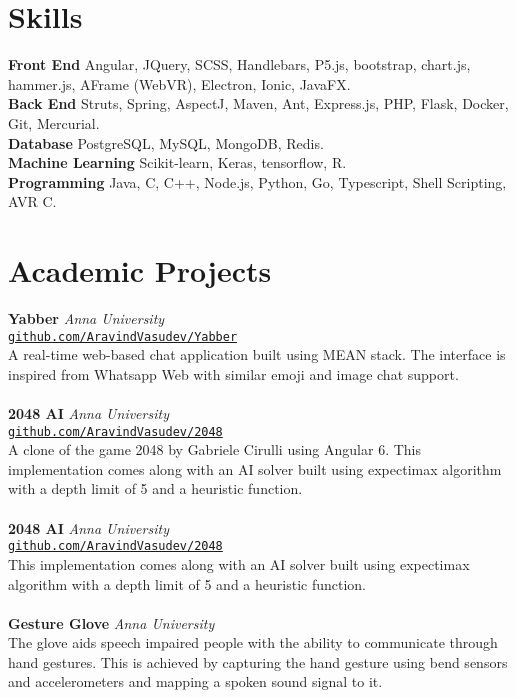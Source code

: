 \documentclass{resume}
\begin{document}
\begin{multicols*}{2}
\section*{Skills}
\noindent
\textbf{Front End} Angular, JQuery, SCSS, Handlebars, P5.js, bootstrap, chart.js, hammer.js, AFrame (WebVR), Electron, Ionic, JavaFX. \\
\textbf{Back End} Struts, Spring, AspectJ, Maven, Ant, Express.js, PHP, Flask, Docker, Git, Mercurial. \\
\textbf{Database} PostgreSQL, MySQL, MongoDB, Redis. \\
\textbf{Machine Learning} Scikit-learn, Keras, tensorflow, R. \\
\textbf{Programming} Java, C, C++, Node.js, Python, Go, Typescript, Shell Scripting, AVR C.

\section*{Academic Projects}
\noindent
\textbf{Yabber} \hfill \textit{Anna University} \\
\texttt{\small \href{https://github.com/AravindVasudev/Yabber}{github.com/AravindVasudev/Yabber}} \\
A real-time web-based chat application built using MEAN stack. The interface is inspired from Whatsapp Web with similar emoji and image chat support. \\
\\
\textbf{2048 AI} \hfill \textit{Anna University} \\
\texttt{\small \href{https://github.com/AravindVasudev/2048}{github.com/AravindVasudev/2048}} \\
A clone of the game 2048 by Gabriele Cirulli using Angular 6. This implementation comes along with an AI solver built using expectimax algorithm with a depth limit of 5 and a heuristic function. \\
\\
\textbf{2048 AI} \hfill \textit{Anna University} \\
\texttt{\small \href{https://github.com/AravindVasudev/2048}{github.com/AravindVasudev/2048}} \\
This implementation comes along with an AI solver built using expectimax algorithm with a depth limit of 5 and a heuristic function. \\
\\
\textbf{Gesture Glove} \hfill \textit{Anna University} \\
The glove aids speech impaired people with the ability to communicate through hand gestures. This is achieved by capturing the hand gesture using bend sensors and accelerometers and mapping a spoken sound signal to it. \\
\\


\end{multicols*}
\end{document}
